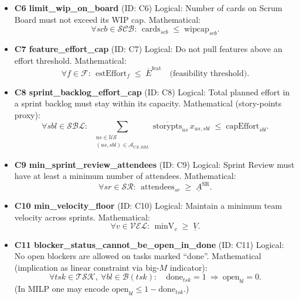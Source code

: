 \documentclass[11pt,a4paper]{article}
\begin{document}
\begin{itemize}
  \item \textbf{C6 limit\_wip\_on\_board} (ID: C6)\newline
  Logical: Number of cards on Scrum Board must not exceed its WIP cap.\newline
  Mathematical:
  \[
    \forall scb\in\mathcal{SCB}:\ \ \text{cards}_{scb} \;\le\; \text{wipcap}_{scb}.
  \]

  \item \textbf{C7 feature\_effort\_cap} (ID: C7)\newline
  Logical: Do not pull features above an effort threshold.\newline
  Mathematical:
  \[
    \forall f\in\mathcal{F}:\ \ \text{estEffort}_{f} \;\le\; \overline{E}^{\text{feat}} \quad \text{(feasibility threshold)}.
  \]

  \item \textbf{C8 sprint\_backlog\_effort\_cap} (ID: C8)\newline
  Logical: Total planned effort in a sprint backlog must stay within its capacity.\newline
  Mathematical (story-points proxy):
  \[
    \forall sbl\in\mathcal{SBL}:\ \ \sum_{\substack{us\in\mathcal{US}\\(us,sbl)\in\mathcal{A}_{US,SBL}}} \overline{\text{storypts}}_{us}\, x_{us,sbl} \;\le\; \text{capEffort}_{sbl}.
  \]

  \item \textbf{C9 min\_sprint\_review\_attendees} (ID: C9)\newline
  Logical: Sprint Review must have at least a minimum number of attendees.\newline
  Mathematical:
  \[
    \forall sr\in\mathcal{SR}:\ \ \text{attendees}_{sr} \;\ge\; \underline{A}^{\text{SR}}.
  \]

  \item \textbf{C10 min\_velocity\_floor} (ID: C10)\newline
  Logical: Maintain a minimum team velocity across sprints.\newline
  Mathematical:
  \[
    \forall v\in\mathcal{VEL}:\ \ \text{minV}_{v} \;\ge\; \underline{V}.
  \]

  \item \textbf{C11 blocker\_status\_cannot\_be\_open\_in\_done} (ID: C11)\newline
  Logical: No open blockers are allowed on tasks marked ``done''.\newline
  Mathematical (implication as linear constraint via big-$M$ indicator):
  \[
    \forall tsk\in\mathcal{TSK},\ \forall bl\in\mathcal{B}(tsk):\quad \text{done}_{tsk}=1 \ \Rightarrow\ \text{open}_{bl}=0.
  \]
  (In MILP one may encode $\text{open}_{bl}\le 1-\text{done}_{tsk}$.)
\end{itemize}
\end{document}
